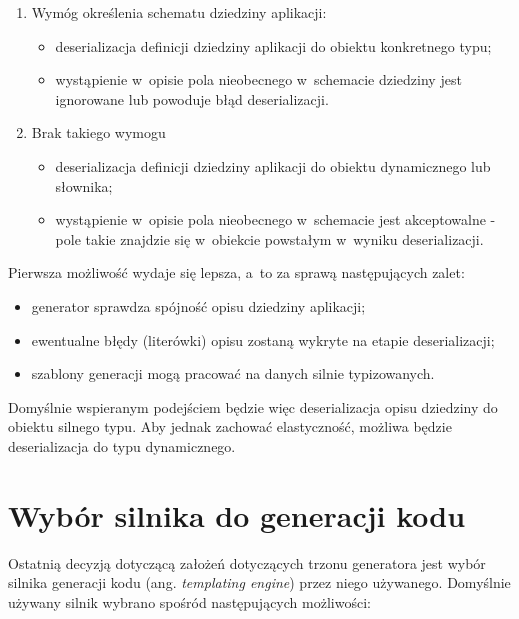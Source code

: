 \begin{enumerate}
 \item Wymóg określenia schematu dziedziny aplikacji:
  \begin{itemize}
   \item deserializacja definicji dziedziny aplikacji do obiektu konkretnego typu;
   \item wystąpienie w~opisie pola nieobecnego w~schemacie dziedziny jest ignorowane lub powoduje błąd deserializacji.
  \end{itemize}
 \item Brak takiego wymogu
  \begin{itemize}
   \item deserializacja definicji dziedziny aplikacji do obiektu dynamicznego lub słownika;
   \item wystąpienie w~opisie pola nieobecnego w~schemacie jest akceptowalne - pole takie znajdzie się w~obiekcie powstałym w~wyniku deserializacji.
  \end{itemize}

\end{enumerate}

Pierwsza możliwość wydaje się lepsza, a~to za sprawą następujących zalet:

\begin{itemize}
 \item generator sprawdza spójność opisu dziedziny aplikacji;
 \item ewentualne błędy (literówki) opisu zostaną wykryte na etapie deserializacji;
 \item szablony generacji mogą pracować na danych silnie typizowanych.
\end{itemize}

Domyślnie wspieranym podejściem będzie więc deserializacja opisu dziedziny do obiektu silnego typu.
Aby jednak zachować elastyczność, możliwa będzie deserializacja do typu dynamicznego.



\section{Wybór silnika do generacji kodu} \label{sec:core:templating_engine}

Ostatnią decyzją dotyczącą założeń dotyczących trzonu generatora jest wybór silnika generacji kodu (ang. \emph{templating engine}) przez niego używanego.
Domyślnie używany silnik wybrano spośród następujących możliwości:


